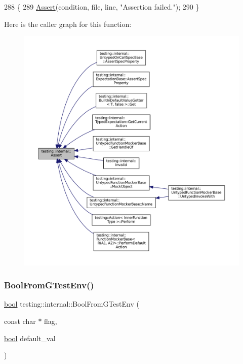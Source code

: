 \begin{DoxyCode}
288                                                                \{
289   \hyperlink{namespacetesting_1_1internal_a7a259643b7f2d23ce2b757728df42c99}{Assert}(condition, file, line, \textcolor{stringliteral}{"Assertion failed."});
290 \}
\end{DoxyCode}
Here is the caller graph for this function\+:
\nopagebreak
\begin{figure}[H]
\begin{center}
\leavevmode
\includegraphics[width=350pt]{namespacetesting_1_1internal_a7a259643b7f2d23ce2b757728df42c99_icgraph}
\end{center}
\end{figure}
\mbox{\label{namespacetesting_1_1internal_a67132cdce23fb71b6c38ee34ef81eb4c}} 
\subsubsection{\texorpdfstring{Bool\+From\+G\+Test\+Env()}{BoolFromGTestEnv()}}
{\footnotesize\ttfamily \hyperlink{classbool}{bool} testing\+::internal\+::\+Bool\+From\+G\+Test\+Env (\begin{DoxyParamCaption}\item[{const char $\ast$}]{flag,  }\item[{\hyperlink{classbool}{bool}}]{default\+\_\+val }\end{DoxyParamCaption})}



